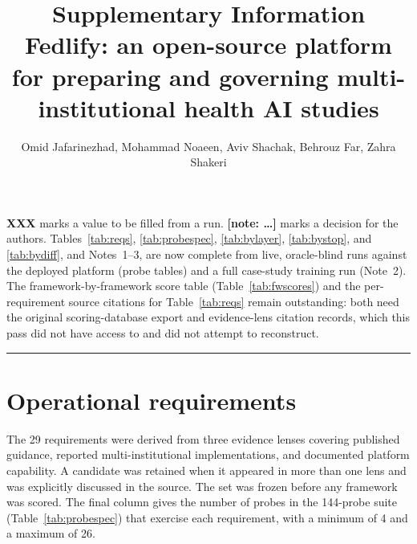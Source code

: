 \documentclass[10pt,a4paper]{article}
\title{\vspace{-1.4cm}\bfseries Supplementary Information\\[4pt]
\large Fedlify: an open-source platform for preparing and governing
multi-institutional health AI studies}
\author{\normalsize Omid Jafarinezhad, Mohammad Noaeen, Aviv Shachak, Behrouz Far,
Zahra Shakeri}
\date{}
\newif\iffixmeoff \fixmeofffalse
\newenvironment{tkbox}[1]{%
  \begin{tcolorbox}[breakable,colback=tkred!4,colframe=tkred,boxrule=0.6pt,
    left=6pt,right=6pt,top=5pt,bottom=5pt,
    title={\footnotesize\bfseries #1},fonttitle=\color{white}]\small}{\end{tcolorbox}}
\begin{document}
\maketitle
\vspace{-1.0cm}

\iffixmeoff\else
\begin{tkbox}{Status of this document}
\textcolor{tkred}{\textbf{XXX}} marks a value to be filled from a run.
\textcolor{tkred}{\textbf{[note: \ldots]}} marks a decision for the authors.
Tables~\ref{tab:reqs}, \ref{tab:probespec}, \ref{tab:bylayer}, \ref{tab:bystop}, and
\ref{tab:bydiff}, and Notes~1--3, are now complete from live, oracle-blind runs
against the deployed platform (probe tables) and a full case-study training run
(Note~2). The framework-by-framework score table (Table~\ref{tab:fwscores}) and the
per-requirement source citations for Table~\ref{tab:reqs} remain outstanding: both
need the original scoring-database export and evidence-lens citation records, which
this pass did not have access to and did not attempt to reconstruct.
\end{tkbox}
\fi

\tableofcontents
\vspace{6pt}
\hrule

\section{Operational requirements}

The 29 requirements were derived from three evidence lenses covering published
guidance, reported multi-institutional implementations, and documented platform
capability. A candidate was retained when it appeared in more than one lens and was
explicitly discussed in the source. The set was frozen before any framework was
scored. The final column gives the number of probes in the 144-probe suite
(Table~\ref{tab:probespec}) that exercise each requirement, with a minimum of 4 and a maximum of 26.
\end{document}
